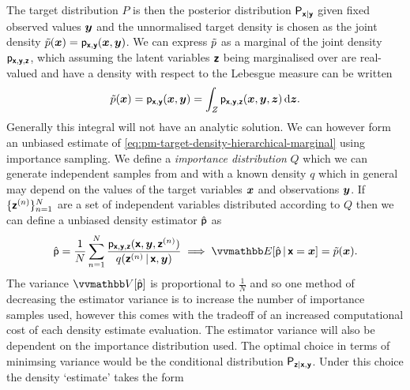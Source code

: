 The target distribution $P$ is then the posterior distribution $\mathsf{P}_{\boldsymbol{\mathsf{x}}|\boldsymbol{\mathsf{y}}}$ given fixed observed values $\boldsymbol{y}$ and the unnormalised target density is chosen as the joint density $\tilde{p}(\boldsymbol{x}) = \mathsf{p}_{\boldsymbol{\mathsf{x}},\boldsymbol{\mathsf{y}}}(\boldsymbol{x},\boldsymbol{y})$. We can express $\tilde{p}$ as a marginal of the joint density $\mathsf{p}_{\boldsymbol{\mathsf{x}},\boldsymbol{\mathsf{y}},\boldsymbol{\mathsf{z}}}$, which assuming the latent variables $\boldsymbol{\mathsf{z}}$ being marginalised over are real-valued and have a density with respect to the Lebesgue measure can be written
\begin{equation}\label{eq:pm-target-density-hierarchical-marginal}
  \tilde{p}(\boldsymbol{x}) = \mathsf{p}_{\boldsymbol{\mathsf{x}},\boldsymbol{\mathsf{y}}}(\boldsymbol{x},\boldsymbol{y}) =
  \int_{\mathit{Z}} \mathsf{p}_{\boldsymbol{\mathsf{x}},\boldsymbol{\mathsf{y}},\boldsymbol{\mathsf{z}}}(\boldsymbol{x},\boldsymbol{y},\boldsymbol{z}) \,\mathrm{d}\boldsymbol{z}.
\end{equation}
Generally this integral will not have an analytic solution. We can however form an unbiased estimate of \eqref{eq:pm-target-density-hierarchical-marginal} using importance sampling. We define a \emph{importance distribution} $Q$ which we can generate independent samples from and with a known density $q$ which in general may depend on the values of the target variables $\boldsymbol{x}$ and observations $\boldsymbol{y}$. If $\lbrace \boldsymbol{\mathsf{z}}^{(n)} \rbrace_{n=1}^N$ are a set of independent variables distributed according to $Q$ then we can define a unbiased density estimator $\hat{\mathsf{p}}$ as
\begin{equation}\label{eq:pm-hierarchical-model-importance-sampling-estimator}
  \hat{\rvar{p}} = \frac{1}{N} \sum_{n=1}^N \frac{\pden{\rvct{x},\rvct{y},\rvct{z}}(\rvct{x},\vct{y},\rvct{z}^{(n)})}{q(\rvct{z}^{(n)}\gvn\rvct{x},\vct{y})} \implies
  \expc{\hat{\rvar{p}}\gvn\rvct{x} = \vct{x}} = \utgtdens(\vct{x}).
\end{equation}
The variance $\var{\hat{\rvar{p}}}$ is proportional to $\frac{1}{N}$ and so one method of decreasing the estimator variance is to increase the number of importance samples used, however this comes with the tradeoff of an increased computational cost of each density estimate evaluation. The estimator variance will also be dependent on the importance distribution used. The optimal choice in terms of minimsing variance would be the conditional distribution $\mathsf{P}_{\boldsymbol{\mathsf{z}}|\boldsymbol{\mathsf{x}},\boldsymbol{\mathsf{y}}}$. Under this choice the density `estimate' takes the form
